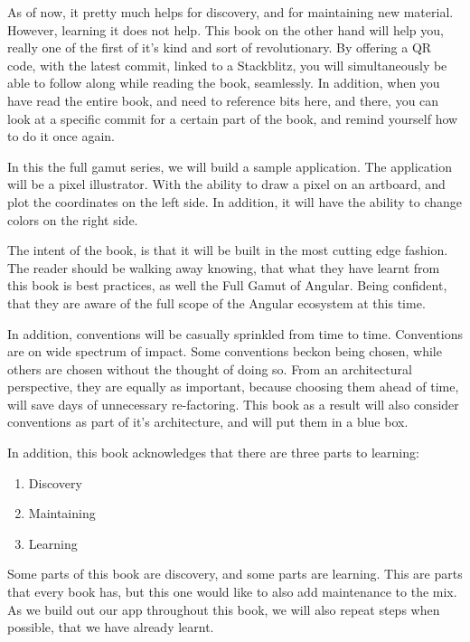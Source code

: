 As of now, it pretty much helps for discovery, and for maintaining new material.
However, learning it does not help. This book on the other hand will help you,
really one of the first of it's kind and sort of revolutionary. By offering a
QR code, with the latest commit, linked to a Stackblitz, you will simultaneously
be able to follow along while reading the book, seamlessly. In addition, when
you have read the entire book, and need to reference bits here, and there,
you can look at a specific commit for a certain part of the book, and remind
yourself how to do it once again.

In this the full gamut series, we will build a sample application. The
application will be a pixel illustrator. With the ability to draw a pixel on an
artboard, and plot the coordinates on the left side. In addition, it will have
the ability to change colors on the right side.

The intent of the book, is that it will be built in the most cutting edge
fashion. The reader should be walking away knowing, that what they have learnt
from this book is best practices, as well the Full Gamut of Angular. Being
confident, that they are aware of the full scope of the Angular ecosystem at
this time.

In addition, conventions will be casually sprinkled from time to time.
Conventions are on wide spectrum of impact. Some conventions beckon being
chosen, while others are chosen without the thought of doing so. From an
architectural perspective, they are equally as important, because choosing them
ahead of time, will save days of unnecessary re-factoring. This book as a result
will also consider conventions as part of it's architecture, and will put them
in a blue box.

In addition, this book acknowledges that there are three parts to learning:
\begin{enumerate}
  \item Discovery
  \item Maintaining
  \item Learning
\end{enumerate}

Some parts of this book are discovery, and some parts are learning. This are
parts that every book has, but this one would like to also add maintenance to
the mix. As we build out our app throughout this book, we will also repeat steps
when possible, that we have already learnt.

